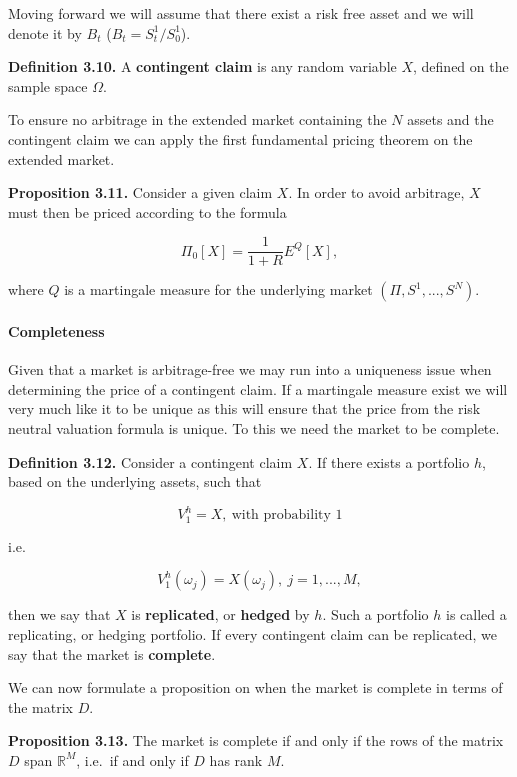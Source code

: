 \documentclass[
]{article}
\begin{document}
Moving forward we will assume that there exist a risk free asset and we
will denote it by \(B_t\) (\(B_t=S^1_t/S^1_0\)).

\textbf{Definition 3.10.} A \textbf{contingent claim} is any random
variable \(X\), defined on the sample space \(\Omega\).

To ensure no arbitrage in the extended market containing the \(N\)
assets and the contingent claim we can apply the first fundamental
pricing theorem on the extended market.

\textbf{Proposition 3.11.} Consider a given claim \(X\). In order to
avoid arbitrage, \(X\) must then be priced according to the formula

\[
\Pi_0[X]=\frac{1}{1+R}E^Q[X],\tag{3.10}
\]

where \(Q\) is a martingale measure for the underlying market
\((\Pi,S^1,...,S^N)\).

\hypertarget{completeness}{%
\paragraph{Completeness}\label{completeness}}

Given that a market is arbitrage-free we may run into a uniqueness issue
when determining the price of a contingent claim. If a martingale
measure exist we will very much like it to be unique as this will ensure
that the price from the risk neutral valuation formula is unique. To
this we need the market to be complete.

\textbf{Definition 3.12.} Consider a contingent claim \(X\). If there
exists a portfolio \(h\), based on the underlying assets, such that

\[
V_1^h=X,\ \text{with probability 1}\tag{3.11}
\]

i.e.

\[
V_1^h(\omega_j)=X(\omega_j),\ j=1,...,M,\tag{3.12}
\]

then we say that \(X\) is \textbf{replicated}, or \textbf{hedged} by
\(h\). Such a portfolio \(h\) is called a replicating, or hedging
portfolio. If every contingent claim can be replicated, we say that the
market is \textbf{complete}.

We can now formulate a proposition on when the market is complete in
terms of the matrix \(D\).

\textbf{Proposition 3.13.} The market is complete if and only if the
rows of the matrix \(D\) span \(\mathbb{R}^M\), i.e.~if and only if
\(D\) has rank \(M\).
\end{document}

